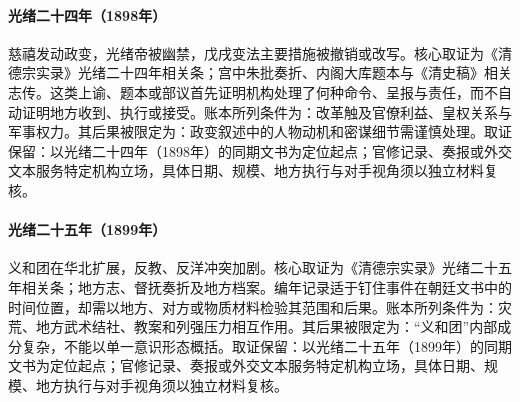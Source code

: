 \hypertarget{ledger:EQ-1898-WUXU-COUP}{}\paragraph{光绪二十四年（1898年）}慈禧发动政变，光绪帝被幽禁，戊戌变法主要措施被撤销或改写。核心取证为《清德宗实录》光绪二十四年相关条；宫中朱批奏折、内阁大库题本与《清史稿》相关志传。这类上谕、题本或部议首先证明机构处理了何种命令、呈报与责任，而不自动证明地方收到、执行或接受。账本所列条件为：改革触及官僚利益、皇权关系与军事权力。其后果被限定为：政变叙述中的人物动机和密谋细节需谨慎处理。取证保留：以光绪二十四年（1898年）的同期文书为定位起点；官修记录、奏报或外交文本服务特定机构立场，具体日期、规模、地方执行与对手视角须以独立材料复核。
\hypertarget{ledger:EQ-1899-BOXER-UPRISING}{}\paragraph{光绪二十五年（1899年）}义和团在华北扩展，反教、反洋冲突加剧。核心取证为《清德宗实录》光绪二十五年相关条；地方志、督抚奏折及地方档案。编年记录适于钉住事件在朝廷文书中的时间位置，却需以地方、对方或物质材料检验其范围和后果。账本所列条件为：灾荒、地方武术结社、教案和列强压力相互作用。其后果被限定为：“义和团”内部成分复杂，不能以单一意识形态概括。取证保留：以光绪二十五年（1899年）的同期文书为定位起点；官修记录、奏报或外交文本服务特定机构立场，具体日期、规模、地方执行与对手视角须以独立材料复核。

